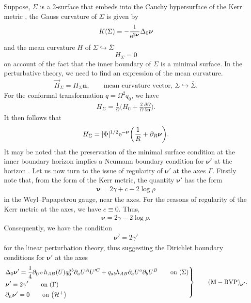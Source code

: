 \documentclass[11pt]{article}
\numberwithin{equation}{section}
\def\ptl{\partial}%
\def\mbo#1{\boldsymbol{#1}}%
\def\olin#1{\overline{#1}{}}%
\numberwithin{equation}{section}
\begin{document}
Suppose, $\Sigma$ is a 2-surface that embeds into the Cauchy hypersurface of the Kerr metric \smash{$(\Sigma \hookrightarrow) \olin{\Sigma}$}, the Gauss curvature of $\Sigma$ is given by
\begin{align*}
K (\Sigma) = - \frac{1}{{\rm e}^{2 \mbo{\nu}}} \Delta_0 \mbo{\nu}
\end{align*}
and the mean curvature $H$ of $\Sigma \hookrightarrow \olin{\Sigma}$
\[
H_\Sigma = 0
\]
on account of the fact that the inner boundary of $\Sigma$ is a minimal surface. In the perturbative theory, we need to find an expression of the mean curvature.
\begin{align*}
\vec{H}_{\Sigma} = H_{\Sigma} \mbo{n}, \qquad \text{mean curvature vector, $\Sigma \hookrightarrow \olin{\Sigma}$}.
\end{align*}
For the conformal transformation $q= \Omega^2 q_0$, we have
\begin{align*}
H_\Sigma = \frac{1}{\Omega} \biggl(H_0 + \frac{2}{\Omega} \frac{ \ptl \Omega}{\ptl \mbo{n}} \biggr).
\end{align*}
It then follows that
\begin{align*}
H_{\Sigma} = \vert \Phi \vert^{1/2} {\rm e}^{-\mbo{\nu}} \biggl(\frac{1}{R} + \ptl_R \mbo{\nu}
\biggr).
\end{align*}
It may be noted that the preservation of the minimal surface condition at the inner boundary horizon  implies a Neumann boundary condition for $\mbo{\nu}'$ at the horizon .
Let us now turn to the issue of regularity of $\mbo{\nu}'$ at the axes $\Gamma$. Firstly note that, from the form of the Kerr metric, the quantity $\mbo{\nu}'$ has the form
\begin{align*}
\mbo{\nu} = 2\gamma + c - 2 \log \rho
\end{align*}
in the Weyl--Papapetrou gauge, near the axes. For the reasons of regularity of the Kerr metric at the axes, we have $c \equiv 0$. Thus,
\begin{align*}
\mbo{\nu} = 2 \gamma - 2 \log \rho.
\end{align*}
Consequently, we have the condition
\begin{align} \label{gamma-nu condition}
\mbo{\nu}' = 2 \gamma'
\end{align}
for the linear perturbation theory, thus suggesting the Dirichlet boundary conditions for $\mbo{\nu}'$ at the axes
\begin{equation*}
\left.\begin{aligned}
&\Delta_0 \mbo{\nu}'=\frac{1}{4} \ptl_{U^C} h_{AB}(U) q^{ab}_{0} \ptl_a U^A U'^C + q_{ab} h_{AB} \ptl_a U^a \ptl_b U^B \qquad \text{on}\ (\Sigma)\\
&\mbo{\nu}' = 2\gamma' \qquad \text{on} \ (\Gamma) \\
&\ptl_n \mbo{\nu}'=0 \qquad \text{on} \ \bigl(\mathcal{H}^{+}\bigr)
\end{aligned}
 \right\}
\qquad {\rm (M-BVP)}_{\mbo{\nu'}}.
\end{equation*}
\end{document}
